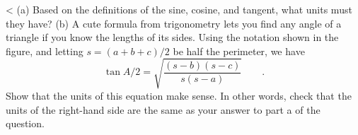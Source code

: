  <%
(a) Based on the definitions of the sine, cosine, and tangent, what units
must they have?
(b) A cute formula from trigonometry lets you find any angle of
a triangle if you know the lengths of its sides. Using the
notation shown in the figure, and letting $s=(a+b+c)/2$ be half the
perimeter, we have 
\begin{equation*}
  \tan A/2=\sqrt{\frac{(s-b)(s-c)}{s(s-a)}} \qquad .
\end{equation*}
Show that the units of this equation make sense. In other words, check that the
units of the right-hand side are the same as your answer to part a of the question.

